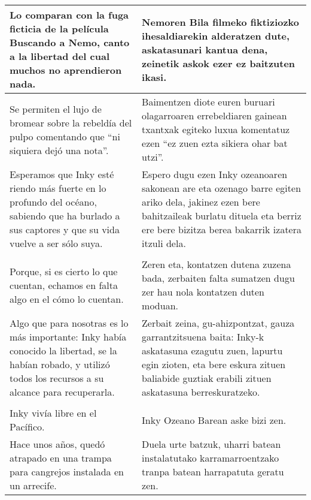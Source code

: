 \documentclass{article}
\begin{document}
\begin{center}
\begin{longtable}{|p{6cm}|p{6cm}|}
  \midrule
  Lo comparan con la fuga ficticia de la película Buscando a Nemo, canto a la libertad del cual muchos no aprendieron nada.&
  Nemoren Bila filmeko fiktiziozko ihesaldiarekin alderatzen dute, askatasunari kantua dena, zeinetik askok ezer ez baitzuten ikasi.\\

  \midrule
  Se permiten el lujo de bromear sobre la rebeldía del pulpo comentando que ``ni siquiera dejó una nota''.&
  Baimentzen diote euren buruari olagarroaren errebeldiaren gainean txantxak egiteko luxua komentatuz ezen ``ez zuen ezta sikiera ohar bat utzi''.\\

  \midrule
  Esperamos que Inky esté riendo más fuerte en lo profundo del océano, sabiendo que ha burlado a sus captores y que su vida vuelve a ser sólo suya.&
  Espero dugu ezen Inky ozeanoaren sakonean are eta ozenago barre egiten ariko dela, jakinez ezen bere bahitzaileak burlatu dituela eta berriz ere bere bizitza berea bakarrik izatera itzuli dela.\\

  \midrule
  \cellcolor{lightgray}{\textbf{Párrafo}} &
  \cellcolor{lightgray}{\textbf{Paragrafoa}}\\
  
  \midrule
  Porque, si es cierto lo que cuentan, echamos en falta algo en el cómo lo cuentan.&
  Zeren eta, kontatzen dutena zuzena bada, zerbaiten falta sumatzen dugu zer hau nola kontatzen duten moduan.\\

  \midrule
  Algo que para nosotras es lo más importante: Inky había conocido la libertad, se la habían robado, y utilizó todos los recursos a su alcance para recuperarla.&
  Zerbait zeina, gu-ahizpontzat, gauza garrantzitsuena baita: Inky-k askatasuna ezagutu zuen, lapurtu egin zioten, eta bere eskura zituen baliabide guztiak erabili zituen askatasuna berreskuratzeko.\\

  \midrule
  \cellcolor{lightgray}{\textbf{Párrafo}} &
  \cellcolor{lightgray}{\textbf{Paragrafoa}}\\
  
  \midrule
  Inky vivía libre en el Pacífico.&
  Inky Ozeano Barean aske bizi zen.\\

  \midrule
  Hace unos años, quedó atrapado en una trampa para cangrejos instalada en un arrecife.&
  Duela urte batzuk, uharri batean instalatutako karramarroentzako tranpa batean harrapatuta geratu zen.\\


\end{longtable}
\end{center}
\end{document}
